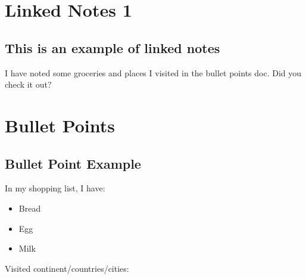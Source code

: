 \documentclass[10pt]{report}
\begin{document}
\tableofcontents


\chapter{Linked Notes 1}

\section{This is an example of linked notes}


I have noted some groceries and places I visited in the  bullet points doc. Did you check it out?
\chapter{Bullet Points}

\section{Bullet Point Example}


In my shopping list, I have:

\begin{itemize}
\item Bread
\item Egg

\item Milk

\end{itemize}


Visited continent/countries/cities:
\end{document}
